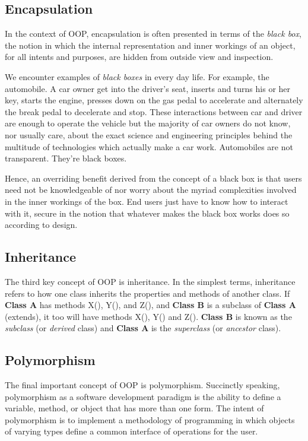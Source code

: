 \documentclass[12pt]{report}
\begin{document}
\subsection{Encapsulation}

In the context of OOP, encapsulation is often presented in terms of the \textit{black box}, the notion in which the internal representation and inner workings of an object, for all intents and purposes, are hidden from outside view and inspection.

We encounter examples of \textit{black boxes} in every day life. For example, the automobile. A car owner get into the driver's seat, inserts and turns his or her key, starts the engine, presses down on the gas pedal to accelerate and alternately the break pedal to decelerate and stop. These interactions between car and driver are enough to operate the vehicle but the majority of car owners do not know, nor usually care, about the exact science and engineering principles behind the multitude of technologies which actually make a car work. Automobiles are not transparent. They're black boxes.

Hence, an overriding benefit derived from the concept of a black box is that users need not be knowledgeable of nor worry about the myriad complexities involved in the inner workings of the box. End users just have to know how to interact with it, secure in the notion that whatever makes the black box works does so according to design. 

\subsection{Inheritance}

The third key concept of OOP is inheritance. In the simplest terms, inheritance refers to how one class inherits the properties and methods of another class. If \textbf{Class A} has methods X(), Y(), and Z(), and \textbf{Class B} is a subclass of \textbf{Class A} (extends), it too will have methods X(), Y() and Z(). \textbf{Class B} is known as the \textit{subclass} (or \textit{derived} class) and \textbf{Class A} is the \textit{superclass} (or \textit{ancestor} class).

\subsection{Polymorphism}

The final important concept of OOP is polymorphism. Succinctly speaking, polymorphism as a software development paradigm is the ability to define a variable, method, or object that has more than one form. The intent of polymorphism is to implement a methodology of programming in which objects of varying types define a common interface of operations for the user.
\end{document}
